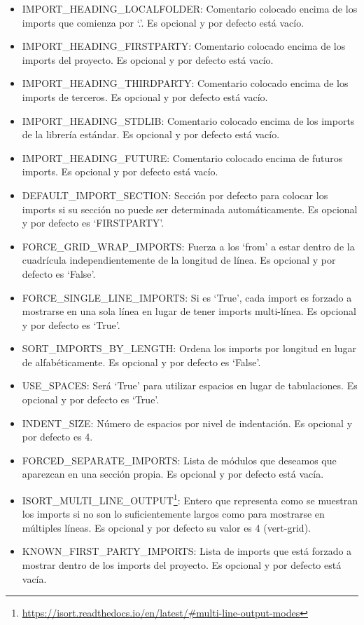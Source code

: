 \documentclass[a4paper, 12pt]{book}
\begin{document}
\begin{itemize}
\begin{itemize}
          \item IMPORT\_HEADING\_LOCALFOLDER: Comentario colocado encima de los imports que comienza por `.'. Es opcional y por defecto está vacío.
          \item IMPORT\_HEADING\_FIRSTPARTY: Comentario colocado encima de los imports del proyecto. Es opcional y por defecto está vacío.
          \item IMPORT\_HEADING\_THIRDPARTY: Comentario colocado encima de los imports de terceros. Es opcional y por defecto está vacío.
          \item IMPORT\_HEADING\_STDLIB: Comentario colocado encima de los imports de la librería estándar. Es opcional y por defecto está vacío.
          \item IMPORT\_HEADING\_FUTURE: Comentario colocado encima de futuros imports. Es opcional y por defecto está vacío.
          \item DEFAULT\_IMPORT\_SECTION: Sección por defecto para colocar los imports si su sección no puede ser determinada automáticamente. Es opcional y por defecto es `FIRSTPARTY'.
          \item FORCE\_GRID\_WRAP\_IMPORTS: Fuerza a los `from' a estar dentro de la cuadrícula independientemente de la longitud de línea. Es opcional y por defecto es `False'.
          \item FORCE\_SINGLE\_LINE\_IMPORTS: Si es `True', cada import es forzado a mostrarse en una sola línea en lugar de tener imports multi-línea. Es opcional y por defecto es `True'.
          \item SORT\_IMPORTS\_BY\_LENGTH: Ordena los imports por longitud en lugar de alfabéticamente. Es opcional y por defecto es `False'.
          \item USE\_SPACES: Será `True' para utilizar espacios en lugar de tabulaciones. Es opcional y por defecto es `True'.
          \item INDENT\_SIZE: Número de espacios por nivel de indentación. Es opcional y por defecto es 4.
          \item FORCED\_SEPARATE\_IMPORTS: Lista de módulos que deseamos que aparezcan en una sección propia. Es opcional y por defecto está vacía.
          \item ISORT\_MULTI\_LINE\_OUTPUT\footnote{\url{https://isort.readthedocs.io/en/latest/#multi-line-output-modes}}: Entero que representa como se muestran los imports si no son lo suficientemente largos como para mostrarse en múltiples líneas. Es opcional y por defecto su valor es 4 (vert-grid).
          \item KNOWN\_FIRST\_PARTY\_IMPORTS: Lista de imports que está forzado a mostrar dentro de los imports del proyecto. Es opcional y por defecto está vacía.

\end{itemize}
\end{itemize}
\end{document}
